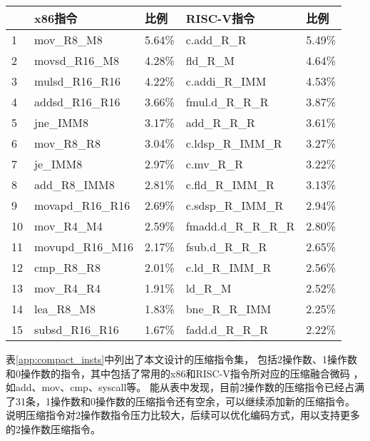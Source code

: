 \begin{table}[]
  \centering
  \label{tab:spec_insts}
  \begin{tabular}{l|ll|ll}
    \hline
     & x86指令            & 比例     & RISC-V指令             & 比例     \\ \hline
  1  & mov\_R8\_M8      & 5.64\% & c.add\_R\_R         & 5.49\% \\
  2  & movsd\_R16\_M8   & 4.28\% & fld\_R\_M           & 4.64\% \\
  3  & mulsd\_R16\_R16  & 4.22\% & c.addi\_R\_IMM      & 4.53\% \\
  4  & addsd\_R16\_R16  & 3.66\% & fmul.d\_R\_R\_R     & 3.87\% \\
  5  & jne\_IMM8        & 3.17\% & add\_R\_R\_R        & 3.61\% \\
  6  & mov\_R8\_R8      & 3.04\% & c.ldsp\_R\_IMM\_R   & 3.27\% \\
  7  & je\_IMM8         & 2.97\% & c.mv\_R\_R          & 3.22\% \\
  8  & add\_R8\_IMM8    & 2.81\% & c.fld\_R\_IMM\_R    & 3.13\% \\
  9  & movapd\_R16\_R16 & 2.69\% & c.sdsp\_R\_IMM\_R   & 2.94\% \\
  10 & mov\_R4\_M4      & 2.59\% & fmadd.d\_R\_R\_R\_R & 2.80\% \\
  11 & movupd\_R16\_M16 & 2.17\% & fsub.d\_R\_R\_R     & 2.65\% \\
  12 & cmp\_R8\_R8      & 2.01\% & c.ld\_R\_IMM\_R     & 2.56\% \\
  13 & mov\_R4\_R4      & 1.91\% & ld\_R\_M            & 2.52\% \\
  14 & lea\_R8\_M8      & 1.83\% & bne\_R\_R\_IMM      & 2.25\% \\
  15 & subsd\_R16\_R16  & 1.67\% & fadd.d\_R\_R\_R     & 2.22\% \\ \hline
  \end{tabular}
  \end{table}





表\ref{app:compact_insts}中列出了本文设计的压缩指令集，
包括2操作数、1操作数和0操作数的指令，其中包括了常用的x86和RISC-V指令所对应的压缩融合微码
，如add、mov、cmp、syscall等。
能从表中发现，目前2操作数的压缩指令已经占满了31条，1操作数和0操作数的压缩指令还有空余，可以继续添加新的压缩指令。
说明压缩指令对2操作数指令压力比较大，后续可以优化编码方式，用以支持更多的2操作数压缩指令。

